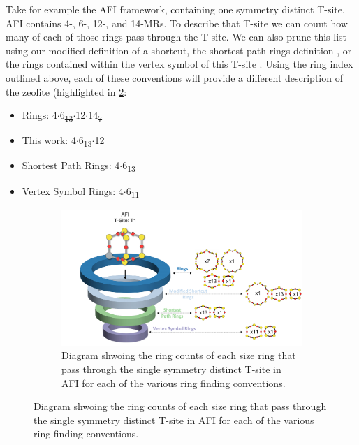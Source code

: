 \documentclass[preprint,numrefs,noinfo,sort&compress]{elsarticle}
\providecommand{\DIFadd}[1]{{\protect\color{blue}\uwave{#1}}} %
\providecommand{\DIFdel}[1]{{\protect\color{red}\sout{#1}}}                      %
\providecommand{\DIFaddbegin}{} %
\providecommand{\DIFaddend}{} %
\providecommand{\DIFdelbegin}{} %
\providecommand{\DIFdelend}{} %
\newcommand{\DIFscaledelfig}{0.5}
\newlength{\DIFdelgraphicswidth} %
\newlength{\DIFdelgraphicsheight} %
\newcommand{\DIFaddincludegraphics}[2][]{{\color{blue}\fbox{\DIFOincludegraphics[#1]{#2}}}} %
\newcommand{\DIFdelincludegraphics}[2][]{%
\sbox{\DIFdelgraphicsbox}{\DIFOincludegraphics[#1]{#2}}%
\settoboxwidth{\DIFdelgraphicswidth}{\DIFdelgraphicsbox} %
\settoboxtotalheight{\DIFdelgraphicsheight}{\DIFdelgraphicsbox} %
\scalebox{\DIFscaledelfig}{%
\parbox[b]{\DIFdelgraphicswidth}{\usebox{\DIFdelgraphicsbox}\\[-\baselineskip] \rule{\DIFdelgraphicswidth}{0em}}\llap{\resizebox{\DIFdelgraphicswidth}{\DIFdelgraphicsheight}{%
\setlength{\unitlength}{\DIFdelgraphicswidth}%
\begin{picture}(1,1)%
\thicklines\linethickness{2pt} %
{\color[rgb]{1,0,0}\put(0,0){\framebox(1,1){}}}%
{\color[rgb]{1,0,0}\put(0,0){\line( 1,1){1}}}%
{\color[rgb]{1,0,0}\put(0,1){\line(1,-1){1}}}%
\end{picture}%
}\hspace*{3pt}}} %
} %
\DeclareRobustCommand{\DIFaddbegin}{\DIFOaddbegin \let\includegraphics\DIFaddincludegraphics} %
\DeclareRobustCommand{\DIFaddend}{\DIFOaddend \let\includegraphics\DIFOincludegraphics} %
\DeclareRobustCommand{\DIFdelbegin}{\DIFOdelbegin \let\includegraphics\DIFdelincludegraphics} %
\DeclareRobustCommand{\DIFdelend}{\DIFOaddend \let\includegraphics\DIFOincludegraphics} %
\begin{document}
Take for example the AFI framework, containing one symmetry distinct T-site. AFI contains 4-, 6-, 12-, and 14-MRs. To describe that T-site we can count how many of each of those rings pass through the T-site. We can also prune this list using our modified definition of a shortcut, the shortest path rings definition \cite{sastre-topological-2009}, or the rings contained within the vertex symbol of this T-site \cite{okeeffe-vertex-1997}. Using the ring index outlined above, each of these conventions will provide a different description of the zeolite (highlighted in \cref{fig:afi-funnel}:
\begin{itemize}
\item Rings: 4\(\cdot\)6\DIFdelbegin \DIFdel{\textsubscript{13}\(\cdot\)}\DIFdelend \DIFaddbegin \DIFadd{\(_{\text{13}} \cdot\)}\DIFaddend 12\(\cdot\)14\DIFdelbegin \DIFdel{\textsubscript{7}
}\DIFdelend \DIFaddbegin \DIFadd{\(_{\text{7}}\)
}\DIFaddend \item This work: 4\(\cdot\)6\DIFdelbegin \DIFdel{\textsubscript{13}\(\cdot\)}\DIFdelend \DIFaddbegin \DIFadd{\(_{\text{13}} \cdot\)}\DIFaddend 12
\item Shortest Path Rings: 4\(\cdot\)6\DIFdelbegin \DIFdel{\textsubscript{13}
}\DIFdelend \DIFaddbegin \DIFadd{\(_{\text{13}}\)
}\DIFaddend \item Vertex Symbol Rings: 4\(\cdot\)6\DIFdelbegin \DIFdel{\textsubscript{11}
}\DIFdelend \DIFaddbegin \DIFadd{\(_{\text{11}}\)
}\DIFaddend \end{itemize}

\begin{figure}
\begin{figure}[H]
\centering
\includegraphics[width=\textwidth]{figures/chapter-3/afi-funnel.pdf}
\caption{Diagram shwoing the ring counts of each size ring that pass through the single symmetry distinct T-site in AFI for each of the various ring finding conventions. \label{fig:afi-funnel}}
\end{figure}
\end{figure}
\end{document}
